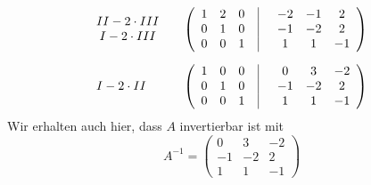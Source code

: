 \begin{beispiel}
$$\begin{array} {l c l}
   	\begin{matrix} II - 2 \cdot III  \\ I - 2 \cdot III  \end{matrix} & &
  	\left(\begin{array} {c c c | c c c} 1 & 2 & 0 \phantom{x} &  \quad -2 & -1 & 2 \\ 
	0 & 1 & 0 \phantom{x} &  \quad -1 & -2 & 2 \\
	0 & 0 &  1 \phantom{x} &  \quad  1 &  1 & -1  \end{array} \right) \\[2.2em] 
   	I - 2 \cdot II & & 
  	\left(\begin{array} {c c c | c c c} 1 & 0 & 0 \phantom{x} &  \quad 0 & 3 & -2 \\ 
	0 & 1 & 0 \phantom{x} &  \quad -1 & -2 & 2 \\ 
	0 & 0 &  1 \phantom{x} &  \quad  1 &  1 & -1 \end{array} \right) 
   	\end{array} $$
Wir erhalten auch hier, dass $A$ invertierbar ist mit 
  	$$ A^{-1} = \left(\begin{matrix}  0 & 3 & -2 \\  -1 & -2 & 2 \\  1 &  1 & -1 \end{matrix} \right) $$
\end{beispiel}

